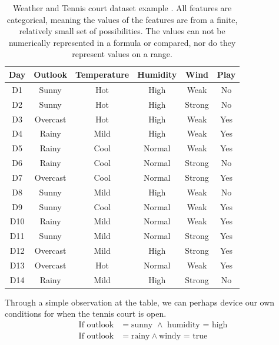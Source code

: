 \begin{table}
\begin{center}
     \begin{tabular}{||c c c c c c||} 
    \hline
     Day & Outlook & Temperature & Humidity & Wind & Play \\ [0.5ex] 
    \hline\hline
     D1 & Sunny & Hot & High & Weak  & No\\ 
    \hline
     D2 & Sunny & Hot & High & Strong  & No\\ 
    \hline
     D3 & Overcast & Hot & High & Weak  & Yes\\ 
    \hline
     D4 & Rainy & Mild & High & Weak  & Yes\\ 
    \hline
     D5 & Rainy & Cool & Normal & Weak  & Yes\\ 
    \hline
     D6 & Rainy & Cool & Normal & Strong  & No\\ 
    \hline
     D7 & Overcast & Cool & Normal & Strong  & Yes\\ 
    \hline
     D8 & Sunny & Mild & High & Weak  & No\\ 
    \hline
     D9 & Sunny & Cool & Normal & Weak  & Yes\\ 
    \hline
     D10 & Rainy & Mild & Normal & Weak  & Yes\\ 
    \hline
     D11 & Sunny & Mild & Normal & Strong  & Yes\\ 
    \hline
     D12 & Overcast & Mild & High & Strong  & Yes\\ 
    \hline
     D13 & Overcast & Hot & Normal & Weak  & Yes\\ 
    \hline
     D14 & Rainy & Mild & High & Strong & No\\  [1ex]
    \hline
  \end{tabular}
\end{center}
\caption{Weather and Tennis court dataset example \cite{mitchell1997machine}. All features are categorical, meaning the values of the features are from a finite, relatively small set of possibilities. The values can not be numerically represented in a formula or compared, nor do they represent values on a range.}
\label{table:categorial_examples_weather}
\end{table}

Through a simple observation at the table, we can perhaps device our own conditions for when the tennis court is open.
\begin{align*}
  	\textrm{If outlook}&=\textrm{sunny } \wedge \textrm{ humidity = high} \\
	\textrm{If outlook}&= \textrm{rainy} \wedge \textrm{windy = true}
\end{align*}

